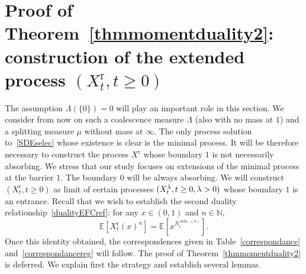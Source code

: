 \documentclass[AHL,Unicode,longabstracts,published]{cedram}
\newcommand{\rmr}{\mathrm{r}}
\newcommand{\bbN}{\mathbb{N}}
\newcommand{\bbE}{\mathbb{E}}
\begin{document}
\section{Proof of Theorem~\ref{thmmomentduality2}: construction of the extended process \texorpdfstring{$(X^{\rmr}_t,t\geq 0)$}{(Xrt,t>= 0)}}\label{sec2}
The assumption $\Lambda(\{0\})=0$ will play an important role in this section. We consider from now on such a coalescence measure $\Lambda$ (also with no mass at $1$) and a splitting measure $\mu$ without mass at $\infty$. The only process solution to~\eqref{SDEselec} whose existence is clear is the minimal process. It will be therefore necessary to construct the process $X^{\rmr}$ whose boundary $1$ is not necessarily absorbing. We stress that our study focuses on extensions of the minimal process at the barrier $1$. The boundary $0$ will be always absorbing. We will construct $(X_t^{\rmr}, t\geq 0)$ as limit of certain processes $(X_t^{\lambda},t\geq 0,\lambda\linebreak>0)$ whose boundary $1$ is an entrance. Recall that we wish to establish the second duality relationship~\eqref{dualityEFCref}: for any $x\in (0,1)$ and $n\in \bbN$,
\[
\bbE\left[X_t^{\rmr}(x)^n\right]=\bbE\left[x^{N_t^{\min,(n)}}\right].
\]
Once this identity obtained, the correspondences given in Table~\ref{correspondance} and~\ref{correspondancereg} will follow. The proof of Theorem~\ref{thmmomentduality2} is deferred. We explain first the strategy and establish several lemmas.
\end{document}
